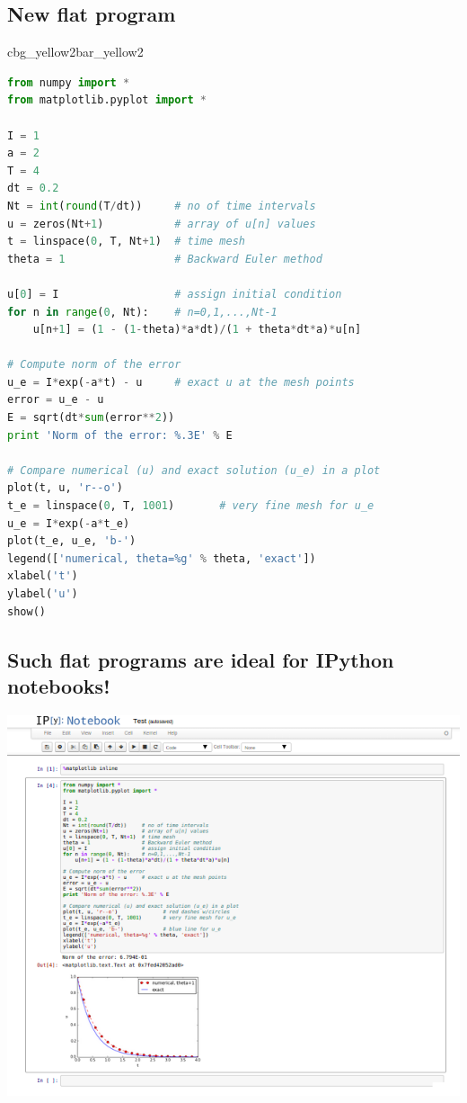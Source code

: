 \documentclass[%
oneside,                 %
final,                   %
10pt]{article}
\newenvironment{_pro_tight}[2]{
   \def\FrameCommand{\color{#2}\vrule width 1mm\normalcolor\colorbox{#1}}
   \FrameRule0.6pt\MakeFramed {\advance\hsize-2mm\FrameRestore}\vskip3mm}
   {\vskip0mm\endMakeFramed}
\newenvironment{pro}[2]{
\bgroup\rmfamily
\fboxsep=0mm\relax
\begin{_pro_tight}{#1}{#2}
\list{}{\parsep=-2mm\parskip=0mm\topsep=0pt\leftmargin=2mm
\rightmargin=2\leftmargin\leftmargin=4pt\relax}
\item\relax}
{\endlist\end{_pro_tight}\egroup}
\begin{document}
\subsection*{New flat program}

\begin{pro}{cbg_yellow2}{bar_yellow2}\begin{lstlisting}[language=Python,style=simple,xleftmargin=2mm]
from numpy import *
from matplotlib.pyplot import *

I = 1
a = 2
T = 4
dt = 0.2
Nt = int(round(T/dt))     # no of time intervals
u = zeros(Nt+1)           # array of u[n] values
t = linspace(0, T, Nt+1)  # time mesh
theta = 1                 # Backward Euler method

u[0] = I                  # assign initial condition
for n in range(0, Nt):    # n=0,1,...,Nt-1
    u[n+1] = (1 - (1-theta)*a*dt)/(1 + theta*dt*a)*u[n]

# Compute norm of the error
u_e = I*exp(-a*t) - u     # exact u at the mesh points
error = u_e - u
E = sqrt(dt*sum(error**2))
print 'Norm of the error: %.3E' % E

# Compare numerical (u) and exact solution (u_e) in a plot
plot(t, u, 'r--o')
t_e = linspace(0, T, 1001)       # very fine mesh for u_e
u_e = I*exp(-a*t_e)
plot(t_e, u_e, 'b-')
legend(['numerical, theta=%g' % theta, 'exact'])
xlabel('t')
ylabel('u')
show()
\end{lstlisting}\end{pro}
\noindent

\subsection*{Such flat programs are ideal for IPython notebooks!}



\centerline{\includegraphics[width=0.9\linewidth]{fig-softeng/ipynb_flat.png}}
\end{document}
